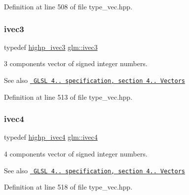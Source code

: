 Definition at line 508 of file type\+\_\+vec.\+hpp.

\mbox{\label{group__core__types_ga6e12a4ca00d696f07da1df4eb73e0fe8}} 
\subsubsection{\texorpdfstring{ivec3}{ivec3}}
{\footnotesize\ttfamily typedef \mbox{\hyperlink{group__core__precision_gaef51de6bc442bfce2602dc301708720a}{highp\+\_\+ivec3}} \mbox{\hyperlink{group__core__types_ga6e12a4ca00d696f07da1df4eb73e0fe8}{glm\+::ivec3}}}

3 components vector of signed integer numbers.

\begin{DoxySeeAlso}{See also}
\href{http://www.opengl.org/registry/doc/GLSLangSpec.4.20.8.pdf}{\texttt{ G\+L\+SL 4.. specification, section 4.. Vectors}} 
\end{DoxySeeAlso}


Definition at line 513 of file type\+\_\+vec.\+hpp.

\mbox{\label{group__core__types_gaa4560ddc50320ea8f8a70d5c9c249fea}} 
\subsubsection{\texorpdfstring{ivec4}{ivec4}}
{\footnotesize\ttfamily typedef \mbox{\hyperlink{group__core__precision_ga9303c2a9e1f1e761961eeecbcda2d34f}{highp\+\_\+ivec4}} \mbox{\hyperlink{group__core__types_gaa4560ddc50320ea8f8a70d5c9c249fea}{glm\+::ivec4}}}

4 components vector of signed integer numbers.

\begin{DoxySeeAlso}{See also}
\href{http://www.opengl.org/registry/doc/GLSLangSpec.4.20.8.pdf}{\texttt{ G\+L\+SL 4.. specification, section 4.. Vectors}} 
\end{DoxySeeAlso}


Definition at line 518 of file type\+\_\+vec.\+hpp.

\mbox{\label{group__core__types_ga8357ec0aab6f8cf69313592492663c3f}} 
